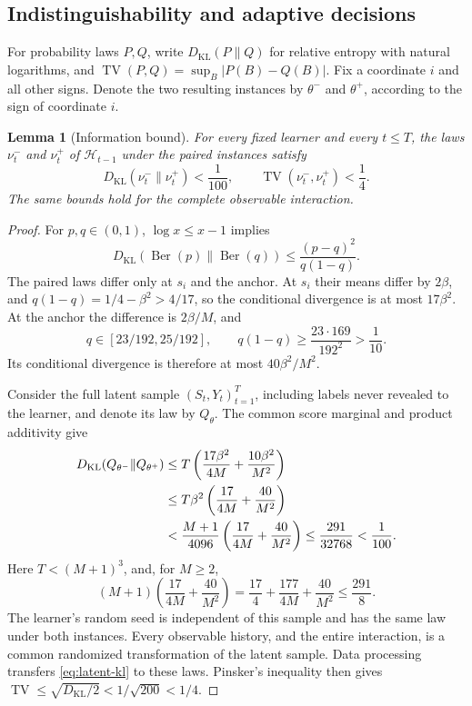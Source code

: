 \documentclass[11pt]{article}
\newtheorem{lemma}[theorem]{Lemma}
\theoremstyle{remark}
\newcommand{\KL}{D_{\mathrm{KL}}}
\newcommand{\TV}{\operatorname{TV}}
\newcommand{\Ber}{\operatorname{Ber}}
\newcommand{\calH}{\mathcal H}
\begin{document}
\subsection{Indistinguishability and adaptive decisions}

For probability laws $P,Q$, write $\KL(P\|Q)$ for relative entropy
with natural logarithms, and $\TV(P,Q)=\sup_B|P(B)-Q(B)|$.
Fix a coordinate $i$ and all other signs. Denote the two resulting
instances by $\theta^-$ and $\theta^+$, according to the sign of
coordinate $i$.

\begin{lemma}[Information bound]
\label{lem:information}
For every fixed learner and every $t\le T$, the laws $\nu_t^-$ and
$\nu_t^+$ of $\calH_{t-1}$ under the paired instances satisfy
\begin{equation}
 \KL(\nu_t^-\|\nu_t^+)<\frac1{100},\qquad
 \TV(\nu_t^-,\nu_t^+)<\frac14.
 \label{eq:information}
\end{equation}
The same bounds hold for the complete observable interaction.
\end{lemma}
\begin{proof}
For $p,q\in(0,1)$, $\log x\le x-1$ implies
\begin{equation}
 \KL(\Ber(p)\|\Ber(q))
 \le\frac{(p-q)^2}{q(1-q)}.
 \label{eq:bernoulli-kl}
\end{equation}
The paired laws differ only at $s_i$ and the anchor. At $s_i$ their
means differ by $2\beta$, and $q(1-q)=1/4-\beta^2>4/17$,
so the conditional divergence is at most $17\beta^2$.
At the anchor the difference is $2\beta/M$, and
\[
 q\in[23/192,25/192],\qquad
 q(1-q)\ge\frac{23\cdot169}{192^2}>\frac1{10}.
\]
Its conditional divergence is therefore at most $40\beta^2/M^2$.

Consider the full latent sample $(S_t,Y_t)_{t=1}^T$, including labels
never revealed to the learner, and denote its law by $Q_\theta$.
The common score marginal and product additivity give
\begin{align}
 \KL(Q_{\theta^-}\|Q_{\theta^+})
 &\le T\left(\frac{17\beta^2}{4M}
                    +\frac{10\beta^2}{M^2}\right)\notag\\
 &\le T\beta^2\left(\frac{17}{4M}+\frac{40}{M^2}\right)\notag\\
 &<\frac{M+1}{4096}\left(\frac{17}{4M}+\frac{40}{M^2}\right)
 \le\frac{291}{32768}<\frac1{100}.
 \label{eq:latent-kl}
\end{align}
Here $T<(M+1)^3$, and, for $M\ge2$,
\[
 (M+1)\left(\frac{17}{4M}+\frac{40}{M^2}\right)
 =\frac{17}{4}+\frac{177}{4M}+\frac{40}{M^2}
 \le\frac{291}{8}.
\]
The learner's random seed is independent of this sample and has the same
law under both instances. Every observable history, and the entire
interaction, is a common randomized transformation of the latent sample.
Data processing transfers \eqref{eq:latent-kl} to these laws.
Pinsker's inequality then gives
$\TV\le\sqrt{\KL/2}<1/\sqrt{200}<1/4$.
\end{proof}
\end{document}
